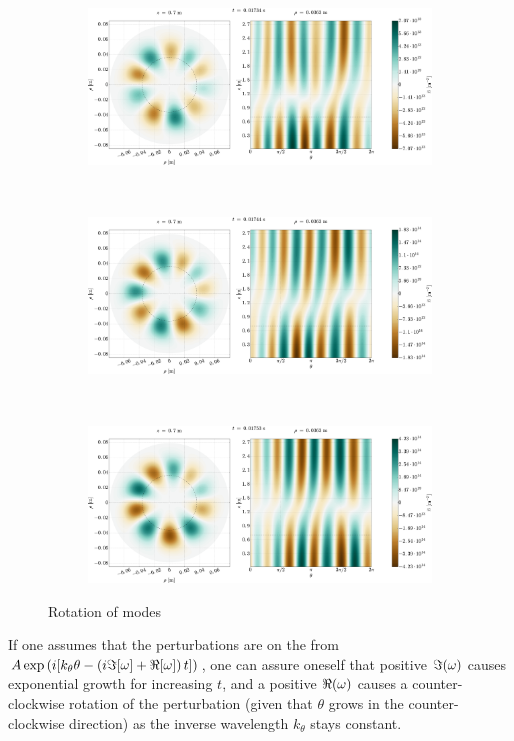 \begin{figure}[htbp]
    \centering
    \begin{subfigure}[h]{1.00\textwidth}
        \centering
        \includegraphics[width=1.0\textwidth]{fig/results/rotModes/n-perpPol-2D-fluct-0}
        \label{fig:rot1}
    \end{subfigure}%
    \\
    \begin{subfigure}[h]{1.00\textwidth}
        \centering
        \includegraphics[width=1.0\textwidth]{fig/results/rotModes/n-perpPol-2D-fluct-1}
        \label{fig:rot2}
    \end{subfigure}
    \\
    \begin{subfigure}[h]{1.00\textwidth}
        \centering
        \includegraphics[width=1.0\textwidth]{fig/results/rotModes/n-perpPol-2D-fluct-2}
        \label{fig:rot3}
    \end{subfigure}
    \caption{Rotation of modes}
    \label{fig:modeRotation}
\end{figure}
\newpage
%
If one assumes that the perturbations are on the from $A\exp\left(i[k_\theta \theta - \left(i\Im[\omega] + \Re[\omega]\right) t]\right)$, one can assure oneself that positive $\Im(\omega)$ causes exponential growth for increasing $t$, and a positive $\Re(\omega)$ causes a counter-clockwise rotation of the perturbation (given that $\theta$ grows in the counter-clockwise direction) as the inverse wavelength $k_\theta$ stays constant.

